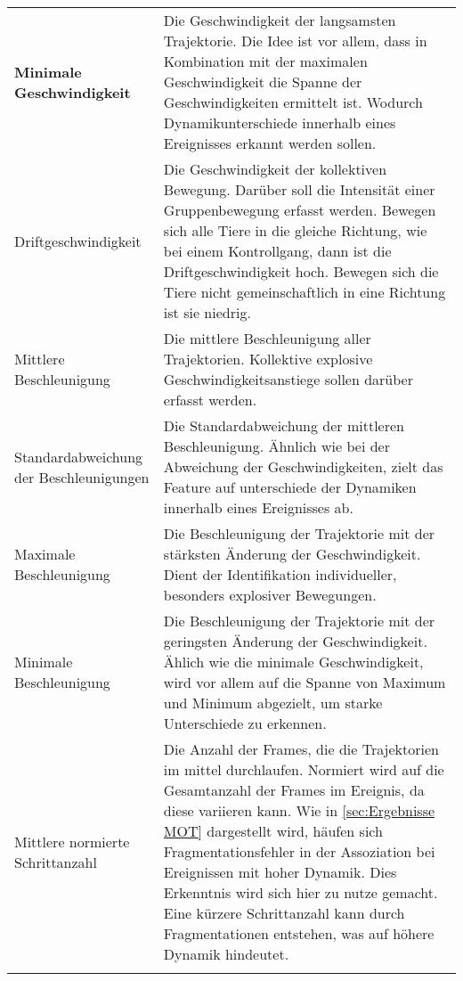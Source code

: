 \begin{longtable}{>{\bfseries}p{} p{}}
Minimale Geschwindigkeit & Die Geschwindigkeit der langsamsten Trajektorie. Die Idee ist vor allem, dass in Kombination mit der maximalen Geschwindigkeit die Spanne der Geschwindigkeiten ermittelt ist. Wodurch Dynamikunterschiede innerhalb eines Ereignisses erkannt werden sollen.  \\
\addlinespace[0.7em] %

Driftgeschwindigkeit & Die Geschwindigkeit der kollektiven Bewegung. Darüber soll die Intensität einer Gruppenbewegung erfasst werden. Bewegen sich alle Tiere in die gleiche Richtung, wie bei einem Kontrollgang, dann ist die Driftgeschwindigkeit hoch. Bewegen sich die Tiere nicht gemeinschaftlich in eine Richtung ist sie niedrig.\\
\addlinespace[0.7em] %

Mittlere Beschleunigung & Die mittlere Beschleunigung aller Trajektorien. Kollektive explosive Geschwindigkeitsanstiege sollen darüber erfasst werden. \\
\addlinespace[0.7em] %

Standardabweichung der Beschleunigungen & Die Standardabweichung der mittleren Beschleunigung. Ähnlich wie bei der Abweichung der Geschwindigkeiten, zielt das Feature auf unterschiede der Dynamiken innerhalb eines Ereignisses ab. \\
\addlinespace[0.7em] %

Maximale Beschleunigung & Die Beschleunigung der Trajektorie mit der stärksten Änderung der Geschwindigkeit. Dient der Identifikation individueller, besonders explosiver Bewegungen.  \\
\addlinespace[0.7em] %

Minimale Beschleunigung & Die Beschleunigung der Trajektorie mit der geringsten Änderung der Geschwindigkeit. Ählich wie die minimale Geschwindigkeit, wird vor allem auf die Spanne von Maximum und Minimum abgezielt, um starke Unterschiede zu erkennen. \\
\addlinespace[0.7em] %

Mittlere normierte Schrittanzahl & Die Anzahl der Frames, die die Trajektorien im mittel durchlaufen. Normiert wird auf die Gesamtanzahl der Frames im Ereignis, da diese variieren kann. Wie in \ref{sec:Ergebnisse MOT} dargestellt wird, häufen sich Fragmentationsfehler in der Assoziation bei Ereignissen mit hoher Dynamik. Dies Erkenntnis wird sich hier zu nutze gemacht. Eine kürzere Schrittanzahl kann durch Fragmentationen entstehen, was auf höhere Dynamik hindeutet. \\
\addlinespace[0.7em] %


\end{longtable}
